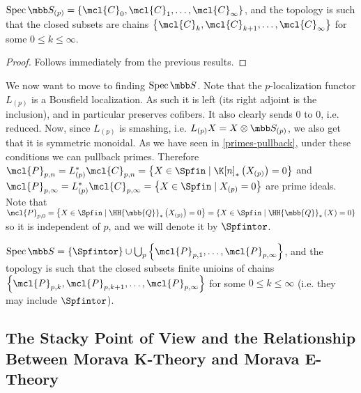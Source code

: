 \begin{corollary}
	$\spec \SS_{\left(p\right)} = \left\{ \mcl{C}_0, \mcl{C}_1, \dotsc, \mcl{C}_\infty \right\}$,
	and the topology is such that the closed subsets are chains
	$\left\{ \mcl{C}_k, \mcl{C}_{k+1}, \dotsc, \mcl{C}_\infty \right\}$
	for some $0 \leq k \leq \infty$.
\end{corollary}

\begin{proof}
	Follows immediately from the previous results.
\end{proof}

We now want to move to finding $\spec \SS$.
Note that the $p$-localization functor $L_{\left(p\right)}$ is a Bousfield localization.
As such it is left (its right adjoint is the inclusion), and in particular preserves cofibers.
It also clearly sends $0$ to $0$, i.e. reduced.
Now, since $L_{\left(p\right)}$ is smashing, i.e. $L_{\left(p\right)} X = X \otimes \SS_{\left(p\right)}$, we also get that it is symmetric monoidal.
As we have seen in \ref{primes-pullback}, under these conditions we can pullback primes.
Therefore
$
\mcl{P}_{p, n}
= L_{\left(p\right)}^* \mcl{C}_{p, n}
= \left\{
	X \in \Spfin
	\mid
	\K[n]_*\left(X_{\left(p\right)}\right) = 0
\right\}
$
and
$
\mcl{P}_{p, \infty}
= L_{\left(p\right)}^* \mcl{C}_{p, \infty}
= \left\{
	X \in \Spfin
	\mid
	X_{\left(p\right)} = 0
\right\}
$
are prime ideals.
Note that
$
\mcl{P}_{p, 0}
= \left\{
	X \in \Spfin
	\mid
	{\HH{\mbb{Q}}}_*\left(X_{\left(p\right)}\right) = 0
\right\}
= \left\{
	X \in \Spfin
	\mid
	{\HH{\mbb{Q}}}_*\left(X\right) = 0
\right\}
$
so it is independent of $p$, and we will denote it by $\Spfintor$.

\begin{theorem}[\todo{explain/reference}]
	$
	\spec \SS
	= \left\{\Spfintor\right\}
	\cup \bigcup_p \left\{\mcl{P}_{p, 1}, \dotsc, \mcl{P}_{p, \infty}\right\}
	$,
	and the topology is such that the closed subsets finite unioins of chains
	$\left\{ \mcl{P}_{p, k}, \mcl{P}_{p, k+1}, \dotsc, \mcl{P}_{p, \infty} \right\}$
	for some $0 \leq k \leq \infty$ (i.e. they may include $\Spfintor$).
\end{theorem}



\subsection{The Stacky Point of View and the Relationship Between Morava K-Theory and Morava E-Theory}

